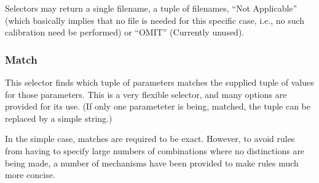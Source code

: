 \documentclass[final,authoryear,5p,times,twocolumn]{elsarticle}
\begin{document}
Selectors may return a single filename, a tuple of filenames,
``Not Applicable'' (which basically implies that no file is
needed for this specific case, i.e., no such calibration need be 
performed) or ``OMIT'' (Currently unused).

\subsubsection{Match}
This selector finds which tuple of parameters matches the supplied tuple
of values for those parameters. This is a very flexible selector, and 
many options are provided for its use. (If only one parameteter is being,
matched, the tuple can be replaced by a simple string.)

In the simple case, matches are required to be exact. However, to avoid
rules from having to specify large numbers of combinations where no
distinctions are being made, a number of mechanisms have been provided
to make rules much more concise.
\end{document}
